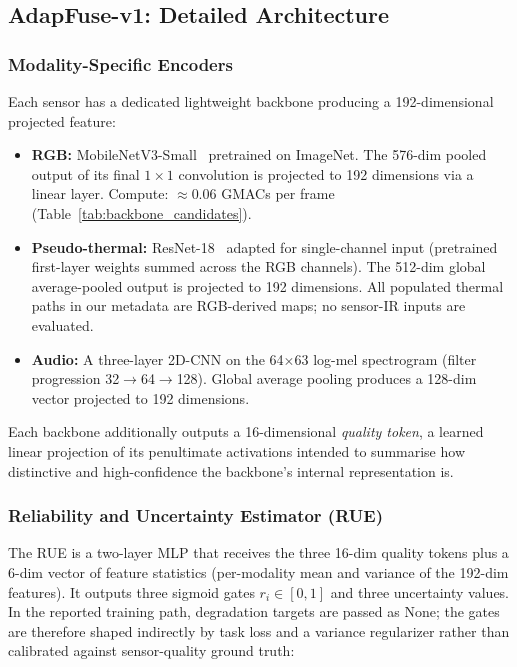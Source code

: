 \documentclass[journal]{IEEEtran}
\begin{document}
\subsection{AdapFuse-v1: Detailed Architecture}

\subsubsection{Modality-Specific Encoders}

Each sensor has a dedicated lightweight backbone producing a 192-dimensional projected feature:

\begin{itemize}
    \item \textbf{RGB:} MobileNetV3-Small~\cite{howard2019mobilenetv3} pretrained on ImageNet. The 576-dim pooled output of its final $1\times1$ convolution is projected to 192 dimensions via a linear layer. Compute: $\approx$0.06 GMACs per frame (Table~\ref{tab:backbone_candidates}).
    \item \textbf{Pseudo-thermal:} ResNet-18~\cite{he2016deep} adapted for single-channel input (pretrained first-layer weights summed across the RGB channels). The 512-dim global average-pooled output is projected to 192 dimensions. All populated thermal paths in our metadata are RGB-derived maps; no sensor-IR inputs are evaluated.
    \item \textbf{Audio:} A three-layer 2D-CNN on the 64$\times$63 log-mel spectrogram (filter progression 32$\to$64$\to$128). Global average pooling produces a 128-dim vector projected to 192 dimensions.
\end{itemize}

Each backbone additionally outputs a 16-dimensional \textit{quality token}, a learned linear projection of its penultimate activations intended to summarise how distinctive and high-confidence the backbone's internal representation is.

\subsubsection{Reliability and Uncertainty Estimator (RUE)}

The RUE is a two-layer MLP that receives the three 16-dim quality tokens plus a 6-dim vector of feature statistics (per-modality mean and variance of the 192-dim features). It outputs three sigmoid gates $r_i \in [0,1]$ and three uncertainty values. In the reported training path, degradation targets are passed as None; the gates are therefore shaped indirectly by task loss and a variance regularizer rather than calibrated against sensor-quality ground truth:
\end{document}
